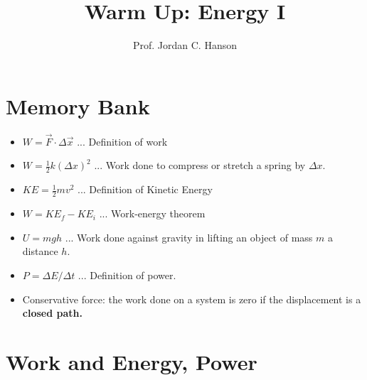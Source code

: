 \documentclass{article}
\begin{document}
\twocolumn

\title{Warm Up: Energy I}
\author{Prof. Jordan C. Hanson}

\maketitle

\section{Memory Bank}

\begin{itemize}
\item $W = \vec{F} \cdot \Delta \vec{x}$ ... Definition of work
\item $W = \frac{1}{2}k(\Delta x)^2$ ... Work done to compress or stretch a spring by $\Delta x$.
\item $KE = \frac{1}{2}m v^2$ ... Definition of Kinetic Energy
\item $W = KE_f - KE_i$ ... Work-energy theorem
\item $U = mgh$ ... Work done against gravity in lifting an object of mass $m$ a distance $h$.
\item $P = \Delta E / \Delta t$ ... Definition of power.
\item Conservative force: the work done on a system is zero if the displacement is a \textbf{closed path.}
\end{itemize}

\section{Work and Energy, Power}
\end{document}
